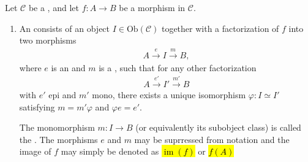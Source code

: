 \begin{definition} \label{definition:image_coimage_of_a_morphism_in_a_category}
Let $\mathcal{C}$ be a , and let $f: A \to B$ be a morphism in $\mathcal{C}$. 
\begin{enumerate}
    \item 
    An  consists of an object $I \in \mathrm{Ob}(\mathcal{C})$ together with a factorization of $f$ into two morphisms
        \begin{align*}
        A \xrightarrow{e} I \xrightarrow{m} B,
        \end{align*}
    where $e$ is an  and $m$ is a , such that for any other factorization
        \begin{align*}
        A \xrightarrow{e'} I' \xrightarrow{m'} B
        \end{align*}
    with $e'$ epi and $m'$ mono, there exists a unique isomorphism $\varphi: I \simeq I'$ satisfying $m = m'\varphi$ and $\varphi e = e'$.
    \begin{center}
    \end{center}
    The monomorphism $m: I \to B$ (or equivalently its subobject class) is called the . The morphisms $e$ and $m$ may be suprressed from notation and the image of $f$ may simply be denoted as \hl{$\operatorname{im}(f)$} or \hl{$f(A)$}


\end{enumerate}
\end{definition}

